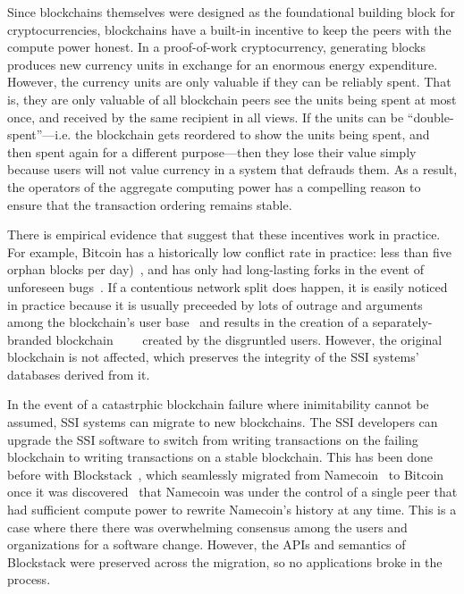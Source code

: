Since blockchains themselves were designed as the foundational building block for
cryptocurrencies, blockchains have a built-in incentive to keep the peers
with the compute power honest.  In a proof-of-work cryptocurrency, generating blocks produces
new currency units in exchange for an enormous energy expenditure.  However, the
currency units are only valuable if they can be reliably
spent.  That is, they are only valuable of all blockchain peers see the units
being spent at most once, and received by the same recipient in all views.
If the units can be ``double-spent''---i.e. the
blockchain gets reordered to show the units being spent, and
then spent again for a different purpose---then they lose their value simply
because users will not value currency in a system that defrauds them.  As a
result, the operators of the aggregate computing power has a compelling
reason to ensure that the transaction ordering remains stable.

There is empirical evidence that suggest that these incentives work in practice.  For
example, Bitcoin has a historically low conflict rate in practice:  
less than five orphan blocks per
day)~\cite{blockchain-info-orphan-rate}, and has only had long-lasting forks in
the event of unforeseen bugs~\cite{bitcoin-deep-fork}.  If a contentious network
split does happen, it is easily noticed in practice because it is usually
preceeded by lots of outrage and arguments among the blockchain's user
base~\cite{bitcoin-controversies} and results in the creation of a
separately-branded
blockchain~\cite{bitcoin-cash}~\cite{ethereum-classic}~\cite{zcash-classic}~\cite{expanse}
created by the disgruntled users.  However, the original blockchain is not
affected, which preserves the integrity of the SSI systems' databases derived
from it.

In the event of a catastrphic blockchain failure where inimitability
cannot be assumed, SSI systems can migrate to new blockchains.  The SSI
developers can upgrade the SSI software to switch from writing transactions on
the failing blockchain to writing transactions on a stable blockchain.  This has
been done before with Blockstack~\cite{blockstack-namecoin-migration}, which
seamlessly migrated from Namecoin~\cite{namecoin} to Bitcoin once it was
discovered~\cite{blockstack} that Namecoin was under the control of a single
peer that had sufficient compute power to rewrite Namecoin's history
at any time.  This is a case where there there was overwhelming consensus among
the users and organizations for a software change.  However, the APIs and
semantics of Blockstack were preserved across the migration, so no applications
broke in the process.

